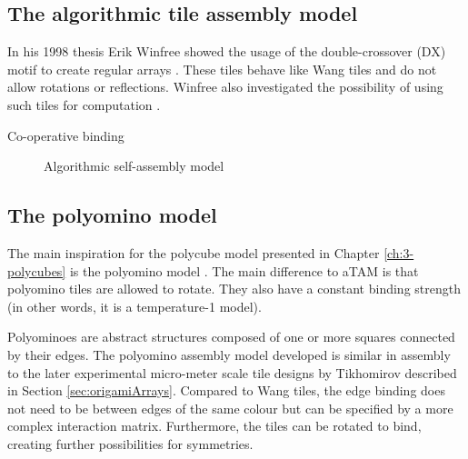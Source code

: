 \subsection{The algorithmic tile assembly model}



In his 1998 thesis Erik Winfree showed the usage of the double-crossover (DX) motif to create regular arrays \cite{winfree1998design}. These tiles behave like Wang tiles\cite{wang1961proving} and do not allow rotations or reflections. Winfree also investigated the possibility of using such tiles for computation \cite{winfree1998algorithmic}.

Co-operative binding

\begin{figure}[h]
  \centering
  \caption{Algorithmic self-assembly model}
\end{figure}

\subsection{The polyomino model}\label{sec:polyomino}

The main inspiration for the polycube model presented in Chapter \ref{ch:3-polycubes} is the polyomino model \cite{ahnert2010self}\cite{johnston2011evolutionary}. The main difference to aTAM is that polyomino tiles are allowed to rotate. They also have a constant binding strength (in other words, it is a temperature-1 model).


Polyominoes are abstract structures composed of one or more squares connected by their edges. The polyomino assembly model developed is similar in assembly to the later experimental micro-meter scale tile designs by Tikhomirov \cite{tikhomirov2017fractal} described in Section \ref{sec:origamiArrays}. Compared to Wang tiles\cite{wang1961proving}, the edge binding does not need to be between edges of the same colour but can be specified by a more complex interaction matrix. Furthermore, the tiles can be rotated to bind, creating further possibilities for symmetries.

